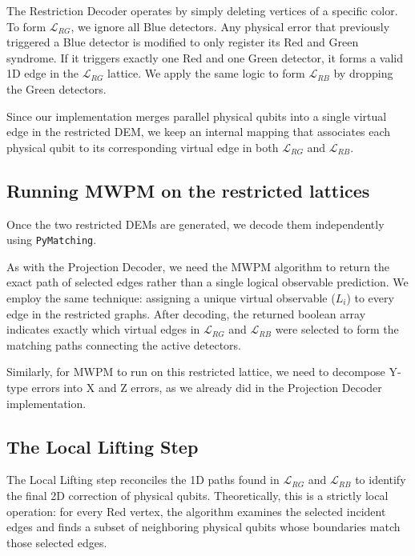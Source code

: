 The Restriction Decoder operates by simply deleting vertices of a specific color. To form $\mathcal{L}_{RG}$, we ignore all Blue detectors. Any physical error that previously triggered a Blue detector is modified to only register its Red and Green syndrome. If it triggers exactly one Red and one Green detector, it forms a valid 1D edge in the $\mathcal{L}_{RG}$ lattice. We apply the same logic to form $\mathcal{L}_{RB}$ by dropping the Green detectors.

Since our implementation merges parallel physical qubits into a single virtual edge in the restricted DEM, we keep an internal mapping that associates each physical qubit to its corresponding virtual edge in both $\mathcal{L}_{RG}$ and $\mathcal{L}_{RB}$.

\subsection{Running MWPM on the restricted lattices}
\label{subsec:restriction_mwpm}

Once the two restricted DEMs are generated, we decode them independently using \texttt{PyMatching}. 

As with the Projection Decoder, we need the MWPM algorithm to return the exact path of selected edges rather than a single logical observable prediction. We employ the same technique: assigning a unique virtual observable ($L_i$) to every edge in the restricted graphs. After decoding, the returned boolean array indicates exactly which virtual edges in $\mathcal{L}_{RG}$ and $\mathcal{L}_{RB}$ were selected to form the matching paths connecting the active detectors.

Similarly, for MWPM to run on this restricted lattice, we need to decompose Y-type errors into X and Z errors, as we already did in the Projection Decoder implementation.

\subsection{The Local Lifting Step}
\label{subsec:restriction_lifting}

The Local Lifting step reconciles the 1D paths found in $\mathcal{L}_{RG}$ and $\mathcal{L}_{RB}$ to identify the final 2D correction of physical qubits. Theoretically, this is a strictly local operation: for every Red vertex, the algorithm examines the selected incident edges and finds a subset of neighboring physical qubits whose boundaries match those selected edges. 

